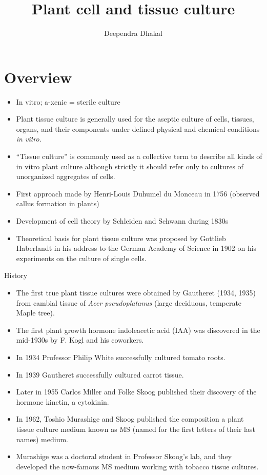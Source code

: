 \documentclass[
  ignorenonframetext,
  aspectratio=169]{beamer}
\title{Plant cell and tissue culture}
\author{Deependra Dhakal}
\date{}
\institute{Agriculture and Forestry University}
\providecommand{\tightlist}{%
  \setlength{\itemsep}{0pt}\setlength{\parskip}{0pt}}
\begin{document}
\frame{\titlepage}

\begin{frame}[allowframebreaks]
  \tableofcontents[hideallsubsections]
\end{frame}
\hypertarget{overview}{%
\section{Overview}\label{overview}}

\begin{frame}{}
\protect\hypertarget{section}{}
\begin{itemize}
\tightlist
\item
  In vitro; a-xenic = sterile culture
\item
  Plant tissue culture is generally used for the aseptic culture of
  cells, tissues, organs, and their components under defined physical
  and chemical conditions \emph{in vitro}.
\item
  ``Tissue culture'' is commonly used as a collective term to describe
  all kinds of in vitro plant culture although strictly it should refer
  only to cultures of unorganized aggregates of cells.
\item
  First approach made by Henri-Louis Duhumel du Monceau in 1756
  (observed callus formation in plants)
\item
  Development of cell theory by Schleiden and Schwann during 1830s
\item
  Theoretical basis for plant tissue culture was proposed by Gottlieb
  Haberlandt in his address to the German Academy of Science in 1902 on
  his experiments on the culture of single cells.
\end{itemize}
\end{frame}

\begin{frame}{History}
\protect\hypertarget{history}{}
\begin{itemize}
\tightlist
\item
  The first true plant tissue cultures were obtained by Gautheret (1934,
  1935) from cambial tissue of \emph{Acer pseudoplatanus} (large
  deciduous, temperate Maple tree).
\item
  The first plant growth hormone indoleacetic acid (IAA) was discovered
  in the mid-1930s by F. Kogl and his coworkers.
\item
  In 1934 Professor Philip White successfully cultured tomato roots.
\item
  In 1939 Gautheret successfully cultured carrot tissue.
\item
  Later in 1955 Carlos Miller and Folke Skoog published their discovery
  of the hormone kinetin, a cytokinin.
\item
  In 1962, Toshio Murashige and Skoog published the composition a plant
  tissue culture medium known as MS (named for the first letters of
  their last names) medium.
\item
  Murashige was a doctoral student in Professor Skoog's lab, and they
  developed the now-famous MS medium working with tobacco tissue
  cultures.
\end{itemize}
\end{frame}
\end{document}
